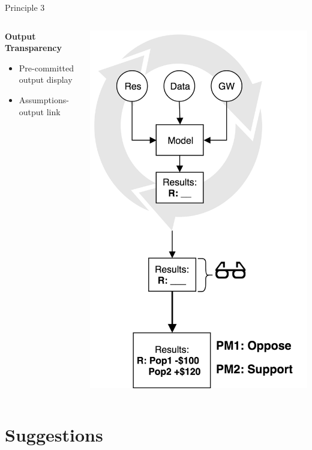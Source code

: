 \documentclass{beamer}
\begin{document}
\begin{frame}{Principle 3}
\begin{columns}
\begin{column}{0.35\textwidth}
 \textbf{Output \\ Transparency}
   \begin{itemize}
   \item Pre-committed output display
   \item Assumptions- output link
   \end{itemize}
\end{column}
\begin{column}{0.7\textwidth}  %
    \begin{center}
    \vspace{-2em}
     \includegraphics[width=.6\textwidth]{../Images/o_transp.png}
     \end{center}
\end{column}
\end{columns}
\end{frame}


\section{Suggestions}
\end{document}
